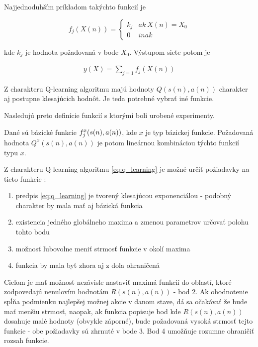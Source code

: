 Najjednoduhším príkladom takýchto funkcií  je


\begin{equation}
f_j(X(n)) =
\left\{
	\begin{array}{ll}
		k_j  & ak \ X(n) = X_0 \\
		0 & inak
	\end{array}
\right.
\label{eq:bfnn_simple}
\end{equation}

kde $k_j$ je hodnota požadovaná v bode $X_0$. Výstupom siete potom je

\begin{align}
y(X) = \sum\limits_{j=1} f_j(X(n))
\label{eq:bfnn_simple_res}
\end{align}

Z charakteru Q-learning algoritmu majú hodnoty $Q(s(n),a(n))$ charakter aj
postupne klesajúcich hodnôt. Je teda potrebné vybrať iné funkcie.

Nasledujú preto definície funkcií s ktorými boli urobené experimenty.

Dané sú bázické funkcie $f_j^x(\boldmath{s(n), a(n)})$, kde $x$ je typ bázickej funkcie.
Požadovaná hodnota $Q^x(s(n), a(n))$ je potom lineárnou kombináciou týchto funkcií typu $x$.

Z charakteru Q-learning algoritmu \ref{eq:q_learning} je možné určiť požiadavky na
tieto funkcie :

\begin{enumerate}
\item predpis \ref{eq:q_learning} je tvorený klesajúcou exponenciálou - podobný charakter by mala mať aj bázická funkcia
\item existencia jedného globálneho maxima a zmenou parametrov určovať polohu tohto bodu
\item možnosť ľubovolne meniť strmosť funkcie v okolí maxima
\item funkcia by mala byť zhora aj z dola ohraničená
\end{enumerate}

Cieľom je mať možnosť nezávisle nastaviť maximá funkcií do oblastí, ktoré zodpovedajú
nenulovím hodnotám $R(s(n), a(n))$ - bod 2. Ak ohodnotenie spĺňa podmienku najlepšej
možnej akcie v danom stave, dá sa očakávať že bude mať menšiu strmosť, naopak, ak funkcia
popisuje bod kde $R(s(n), a(n))$ dosahuje malé hodnoty (obvykle záporné), bude požadovaná
vysoká strmosť tejto funkcie - obe požiadavky sú zhrnuté v bode 3. Bod 4 umožňuje rozumne
ohraničiť rozsah funkcie.

